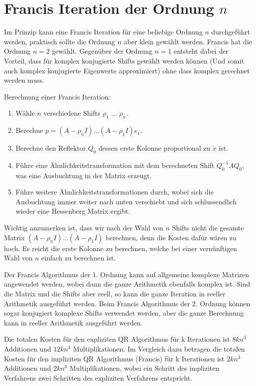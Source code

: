 \section{Francis Iteration der Ordnung $n$}

Im Prinzip kann eine Francis Iteration für eine beliebige Ordnung $n$ durchgeführt werden, praktisch sollte die Ordnung $n$ aber klein gewählt werden.
Francis hat die Ordnung $n=2$ gewählt.
Gegenüber der Ordnung $n=1$ entsteht dabei der Vorteil, dass für komplex konjugierte Shifts gewählt werden können (Und somit auch komplex konjugierte Eigenwerte approximiert) ohne dass komplex gerechnet werden muss.

Berechnung einer Francis Iteration:
\begin{enumerate}
	\item Wähle $n$ verschiedene Shifts $\rho_{1}$ ... $\rho_{n}$.
	\item Berechne $p= (A - \rho_{n}I) ... (A - \rho_{1}I)e_{1}$.
	\item Berechne den Reflektor $Q_{0}$ dessen erste Kolonne proportional zu $x$ ist.
	\item Führe eine Ähnlichkeitstransformation mit dem berechneten Shift $Q_{0}^{-1}AQ_{0}$, was eine \glqq Ausbuchtung \grqq in der Matrix erzeugt.
	\item Führe weitere Ähnlichkeitstransformationen durch, wobei sich die Ausbuchtung immer weiter nach unten verschiebt und sich schlussendlich wieder eine Hessenberg Matrix ergibt.
\end{enumerate}

Wichtig anzumerken ist, dass wir nach der Wahl von $n$ Shifts nicht die gesamte Matrix $(A - \rho_{n}I) ... (A - \rho_{1}I)$ berechnen, denn die Kosten dafür wären zu hoch. Es reicht die erste Kolonne zu berechnen, welche bei einer vernünftigen Wahl von $n$ einfach zu berechnen ist.

Der Francis Algorithmus der 1. Ordnung kann auf allgemeine komplexe Matrizen angewendet werden, wobei dann die ganze Arithmetik ebenfalls komplex ist.
Sind die Matrix und die Shifts aber reell, so kann die ganze Iteration in reeller Arithmetik ausgeführt werden.
Beim Francis Algorithmus der 2. Ordnung können sogar konjugiert komplexe Shifts verwendet werden, aber die ganze Berechnung kann in reeller Arithmetik ausgeführt werden.

Die totalen Kosten für den expliziten QR Algorithmus für k Iterationen ist $8kn^{3}$ Additionen und $12kn^{3}$ Multiplikationen.
Im Vergleich dazu betragen die totalen Kosten für den impliziten QR Algorithmus (Francis) für k Iterationen ist $2kn^{3}$ Additionen und $2kn^{3}$ Multiplikationen, wobei ein Schritt des impliziten Verfahrens zwei Schritten des expliziten Verfahrens entspricht. \cite{francis:EthSeminar}

